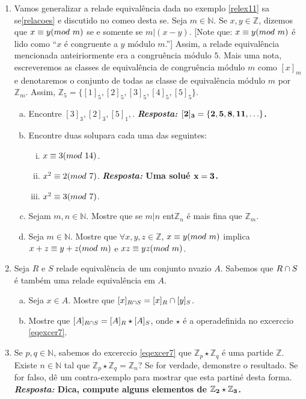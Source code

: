 \begin{enumerate}[{\bf 1.}]
\item Vamos generalizar a rela\cao de equival\^encia dada no exemplo \ref{relex11} sa se\cao \ref{relacoes} e discutido no come\cc o desta se\caoi. Seja $m\in\mathbb{N}$. Se $x,y\in\mathbb{Z}$, dizemos que $x\equiv y(mod \textrm{ } m)$ se e somente se $m|(x-y)$. [Note que: $x\equiv y(mod \textrm{ } m)$ \'e lido como ``$x$ \'e congruente a $y$ m\'odulo $m$.''] Assim, a rela\cao de equival\^encia mencionada anteiriormente era a congru\^encia m\'odulo $5$. Mais uma nota\caoi, escreveremos as classes de equival\^encia de congru\^encia m\'odulo $m$ como $[x]_m$ e denotaremos o conjunto de todas as classe de equival\^encia m\'odulo $m$ por $\mathbb{Z}_m$. Assim, $\mathbb{Z}_5=\{[1]_5,[2]_5,[3]_5,[4]_5,[5]_5\}$.
\begin{enumerate}[a)]
\item Encontre $[3]_3,[2]_3,[5]_1,$. {\bf{\it Resposta:} ${\bf [2]_3=\{2,5,8,11,\ldots\}}$.}
\item Encontre duas solu\coes para cada uma das seguintes:
\begin{enumerate}[i)]
\item $x\equiv 3(mod \textrm{ } 14)$.
\item $x^2\equiv 2(mod \textrm{ } 7)$. {\bf{\it Resposta:} Uma solu\cao \'e ${\bf x=3}$.}
\item $x^2\equiv 3(mod \textrm{ } 7)$.
\end{enumerate}
\item Sejam $m,n\in\mathbb{N}$. Mostre que se $m|n$ ent\ao $\mathbb{Z}_n$ \'e mais fina que $\mathbb{Z}_m$.
\item Seja $m\in\mathbb{N}$. Mostre que $\forall x,y,z\in\mathbb{Z}$, $x\equiv y(mod \textrm{ } m)$ implica $x+z\equiv y+z(mod \textrm{ } m)$ e $xz\equiv yz(mod \textrm{ } m)$.
\end{enumerate}

\item Seja $R$ e $S$ rela\coes de equival\^encia de um conjunto n\ao vazio $A$. Sabemos que $R\cap S$ \'e tamb\'em uma rela\cao de equival\^encia em $A$.
\begin{enumerate}[a)]
\item Seja $x\in A$. Mostre que $[x]_{R\cap S}=[x]_R\cap[y]_S$. 
\item Mostre que $[A]_{R\cap S}=[A]_R\star[A]_S$, onde $\star$ \'e a opera\cao definida no excerc\ih cio \ref{eqexcer7}.
\end{enumerate}

\item Se $p,q\in\mathbb{N}$, sabemos do excerc\ih cio \ref{eqexcer7} que $\mathbb{Z}_p\star\mathbb{Z}_q$ \'e uma parti\cao de $\mathbb{Z}$.  Existe $n\in\mathbb{N}$ tal que $\mathbb{Z}_p\star\mathbb{Z}_q=\mathbb{Z}_n$? Se for verdade, demonstre o resultado. Se for falso, d\^e um contra-exemplo para mostrar que esta parti\cao n\ao \'e desta forma.
{\bf{\it Resposta:} Dica, compute alguns elementos de ${\bf \mathbb{Z}_2\star\mathbb{Z}_3}$.}


\end{enumerate}
